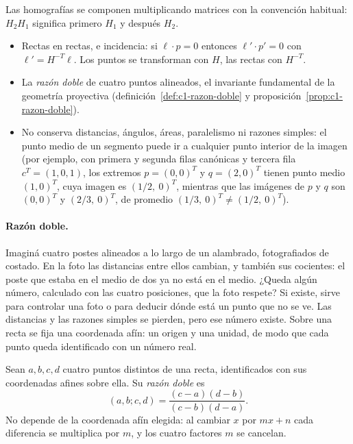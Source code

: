 Las homografías se componen
multiplicando matrices con la convención habitual: \(H_2H_1\) significa primero \(H_1\) y
después \(H_2\).

\begin{resultado}
\begin{itemize}
  \item Rectas en rectas, e incidencia: si \(\ell\cdot p=0\) entonces \(\ell'\cdot p'=0\)
  con \(\ell'=H^{-T}\ell\). Los puntos se transforman con \(H\), las rectas con
  \(H^{-T}\).
  \item La \emph{razón doble} de cuatro puntos alineados, el invariante fundamental de la
  geometría proyectiva (definición~\ref{def:c1-razon-doble} y
  proposición~\ref{prop:c1-razon-doble}).
  \item No conserva distancias, ángulos, áreas, paralelismo ni razones simples: el punto medio
  de un segmento puede ir a cualquier punto interior de la imagen (por ejemplo, con primera y
  segunda filas canónicas y tercera fila \(c^T=(1,0,1)\), los extremos \(p=(0,0)^T\) y
  \(q=(2,0)^T\) tienen punto medio \((1,0)^T\), cuya imagen es \((1/2,\ 0)^T\), mientras que las
  imágenes de \(p\) y \(q\) son \((0,0)^T\) y \((2/3,\ 0)^T\), de promedio \((1/3,\ 0)^T\neq(1/2,\ 0)^T\)).
\end{itemize}
\end{resultado}

\paragraph{Razón doble.}
Imaginá cuatro postes alineados a lo largo de un alambrado, fotografiados de costado. En la foto
las distancias entre ellos cambian, y también sus cocientes: el poste que estaba en el medio de
dos ya no está en el medio. ¿Queda algún número, calculado con las cuatro posiciones, que la
foto respete? Si existe, sirve para controlar una foto o para deducir dónde está un punto que
no se ve. Las distancias y las razones simples se pierden, pero ese número existe.
Sobre una recta se fija una coordenada afín: un origen y una unidad, de modo que cada punto
queda identificado con un número real.

\begin{definicion}\label{def:c1-razon-doble}
Sean \(a,b,c,d\) cuatro puntos distintos de una recta, identificados con sus coordenadas
afines sobre ella. Su \emph{razón doble} es
\[
  (a,b;c,d)=\frac{(c-a)(d-b)}{(c-b)(d-a)} .
\]
No depende de la coordenada afín elegida: al cambiar \(x\) por \(mx+n\) cada diferencia se
multiplica por \(m\), y los cuatro factores \(m\) se cancelan.
\end{definicion}

